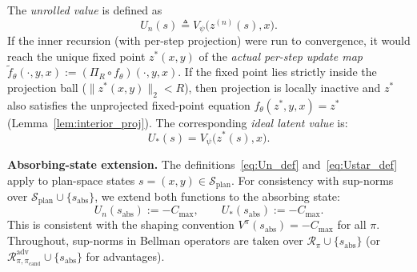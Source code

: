 \documentclass{article}
\theoremstyle{plain}
\theoremstyle{definition}
\theoremstyle{remark}
\newtheorem{remark}[theorem]{Remark}
\newcommand{\longonly}[1]{}
\newcommand{\longonly}[1]{#1}
\newcommand{\SSS}{\mathcal{S}}
\begin{document}
{The \emph{unrolled value} is defined as
\begin{equation}
    U_n(s)
    \triangleq
    V_\psi\bigl(z^{(n)}(s),x\bigr).
    \label{eq:Un_def}
\end{equation}
If the inner recursion (with per-step projection) were run to convergence, it would reach the unique fixed point
$z^*(x,y)$ of the \emph{actual per-step update map} $\tilde f_\theta(\cdot,y,x) := (\Pi_R\circ f_\theta)(\cdot,y,x)$.
If the fixed point lies strictly inside the projection ball ($\|z^*(x,y)\|_2 < R$), then projection is locally inactive and $z^*$ also satisfies the unprojected fixed-point equation $f_\theta(z^*,y,x)=z^*$ (Lemma~\ref{lem:interior_proj}).
The corresponding \emph{ideal latent value} is:
\begin{equation}
    U_*(s) = V_\psi\bigl(z^*(s),x\bigr).
    \label{eq:Ustar_def}
\end{equation}

\textbf{Absorbing-state extension.}
The definitions~\eqref{eq:Un_def} and~\eqref{eq:Ustar_def} apply to plan-space states $s=(x,y)\in\SSS_{\mathrm{plan}}$.
For consistency with sup-norms over $\SSS_{\mathrm{plan}}\cup\{s_{\mathrm{abs}}\}$, we extend both functions to the absorbing state:
\begin{equation}
U_n(s_{\mathrm{abs}}) := -C_{\max}, \qquad U_*(s_{\mathrm{abs}}) := -C_{\max}.
\label{eq:U_sabs_extension}
\end{equation}
This is consistent with the shaping convention $V^\pi(s_{\mathrm{abs}})=-C_{\max}$ for all $\pi$.
Throughout, sup-norms in Bellman operators are taken over $\mathcal{R}_\pi \cup \{s_{\mathrm{abs}}\}$ (or $\mathcal{R}_{\pi,\pi_{\mathrm{cand}}}^{\mathrm{adv}} \cup \{s_{\mathrm{abs}}\}$ for advantages).

\longonly{
\begin{sloppypar}
\begin{remark}[Conceptual vs.\ computable quantities]
\label{rem:conceptual}
$U_*$ equals $V^\pi$ only if $(f_\theta, V_\psi)$ exactly matches the true value function; in general $\|U_* - V^\pi\|_\infty$ is an architectural approximation error.
The quantity $U_*$ is a \emph{conceptual tool} for separating approximation error from unrolling bias---we cannot compute it directly.
In practice, one monitors the empirical $K$-step residual of $U_n$ as a proxy: if the residual is small and $n$ is large (so $\|U_n - U_*\|$ is small by Proposition~\ref{prop:banach}), Lemma~\ref{lem:residual_transfer} implies the architectural residual is also small.
\end{remark}

The resulting picture is generalized policy iteration in plan-space: train $(f_\theta,V_\psi)$ so $U_n\approx V^\pi$, then update $\pi_\phi$ via advantages.
\end{sloppypar}
}%
}%
\end{document}
